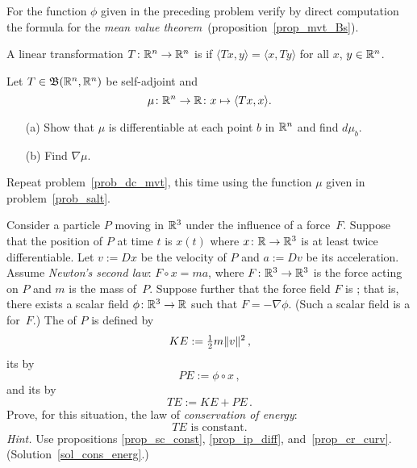 \begin{prob}\label{prob_dc_mvt} For the function $\phi$ given in the preceding problem verify
by direct computation the formula for the \emph{mean value
theorem}~(proposition~\ref{prop_mvt_Bs}).
\end{prob}

\begin{defn}  A linear transformation $T\colon \mathbb{R}^n \rightarrow \mathbb{R}^n$ is
 if $\langle Tx,y \rangle = \langle x,Ty \rangle$ for all $x$, $y \in \mathbb{R}^n$.
\end{defn}

\begin{prob}\label{prob_salt}  Let $T \in \mathfrak{B}(\mathbb{R}^n,\mathbb{R}^n)$ be self-adjoint and
 \[\mu\colon \mathbb{R}^n \rightarrow \mathbb{R}\colon  x \mapsto \langle Tx,x \rangle.\]
 \begin{enumerate}
  \item[(a)]  Show that $\mu$ is differentiable at each point $b$ in $\mathbb{R}^n$ and find $d\mu_b$.
  \item[(b)] Find $\nabla\mu$.
 \end{enumerate}
\end{prob}

\begin{prob}  Repeat problem~\ref{prob_dc_mvt}, this time using the function $\mu$ given in
problem~\ref{prob_salt}.
\end{prob}

\begin{exer}\label{cons_energ} Consider a
particle $P$ moving in $\mathbb{R}^3$ under the influence of a force~$F$. Suppose that the position of
$P$ at time $t$ is $x(t)$ where $x\colon \mathbb{R} \rightarrow \mathbb{R}^3$ is at least twice differentiable.  Let
$v := Dx$ be the velocity of $P$ and $a := Dv$ be its acceleration. Assume
\emph{Newton's second law}: $F \circ x = ma$, where $F\colon \mathbb{R}^3 \rightarrow \mathbb{R}^3$ is the force
acting on $P$ and $m$ is the mass of~$P$. Suppose further that the force field $F$ is
; that is, there exists a scalar field $\phi\colon \mathbb{R}^3 \rightarrow \mathbb{R}$ such that $F
= -\nabla\phi$. (Such a scalar field is a
 for~$F$.)  The
 of $P$ is defined by
  \[ KE := \tfrac12 m \lVert v\rVert^2\,, \]
its
 by
  \[ PE := \phi \circ x\,, \]
and its
 by
  \[ TE := KE + PE\,. \]
Prove, for this situation, the law of \emph{conservation of energy}:
  \[ TE \text{ is constant.} \]
\emph{Hint.}  Use propositions \ref{prop_sc_const}, \ref{prop_ip_diff},
and~\ref{prop_cr_curv}.   (Solution~\ref{sol_cons_energ}.)
\end{exer}

